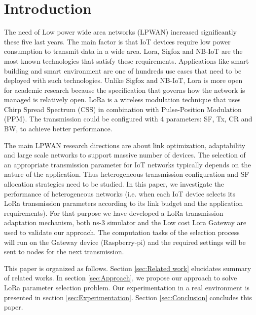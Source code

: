 \section{Introduction} \label{sec:Introduction}

The need of Low power wide area networks (LPWAN) increased significantly these five last years.
The main factor is that IoT devices require low power consumption to transmit data in a wide area.
Lora,
	Sigfox and NB-IoT are the most known technologies that satisfy these requirements.
Applications like smart building and smart environment are one of hundreds use cases that need to be deployed with such technologies.
Unlike Sigfox and NB-IoT,
	Lora is more open for academic research because the specification that governs how the network is managed is relatively open.
LoRa is a wireless modulation technique that uses Chirp Spread Spectrum (CSS) in combination with Pulse-Position Modulation (PPM).
The transmission could be configured with 4 parameters:
	\ac{SF},
	\ac{Tx},
	\ac{CR} and \ac{BW},
	to achieve better performance.

The main LPWAN research directions are about link optimization, adaptability and large scale networks to support massive number of devices.
The selection of an appropriate transmission parameter for IoT networks typically depends on the nature of the application.
Thus heterogeneous transmission configuration and \ac{SF} allocation strategies need to be studied.
In this paper,
	we investigate the performance of heterogeneous networks (i.e.
when each IoT device selects its LoRa transmission parameters according to its link budget and the application requirements).
For that purpose we have developed a LoRa transmission adaptation mechanism,
	both ns-3 simulator and the Low cost Lora Gateway \cite{lowcostloragateway} are used to validate our approach.
The computation tasks of the selection process will run on the Gateway device (Raspberry-pi) and the required settings will be sent to nodes for the next transmission.

This paper is organized as follows.
Section \ref{sec:Related work} elucidates summary of related works.
In section \ref{sec:Approach}, we propose our approach to solve LoRa parameter selection problem.
Our experimentation in a real environment is presented in section \ref{sec:Experimentation}.
Section \ref{sec:Conclusion} concludes this paper.


